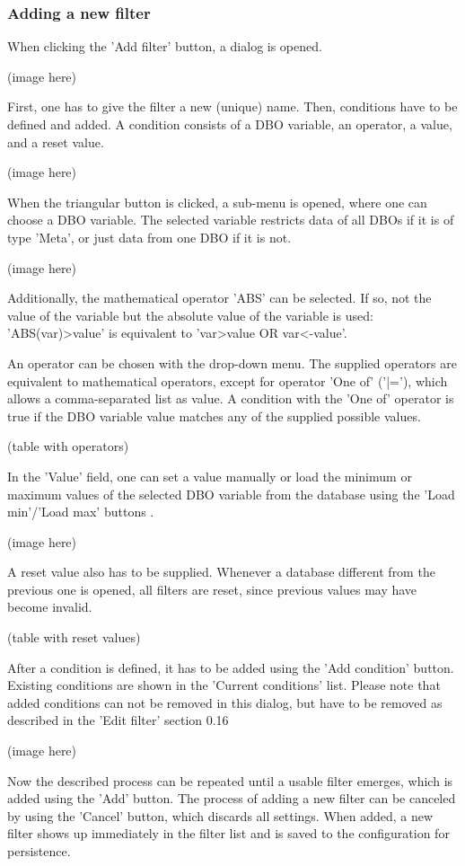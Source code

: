 \documentclass[10pt,letterpaper,extrafontsizes]{memoir}
\begin{document}
\subsubsection{Adding a new filter}
When clicking the 'Add filter' button, a dialog is opened.

(image here)

First, one has to give the filter a new (unique) name. Then, conditions have to be defined and added. A
condition consists of a DBO variable, an operator, a value, and a reset value.

(image here)

When the triangular button is clicked, a sub-menu is opened, where one can choose a DBO variable. The
selected variable restricts data of all DBOs if it is of type 'Meta', or just data from one DBO if it is not.

(image here)

Additionally, the mathematical operator 'ABS' can be selected. If so, not the value of the variable but the
absolute value of the variable is used: 'ABS(var)>value' is equivalent to 'var>value OR var<-value'.

An operator can be chosen with the drop-down menu.  The supplied operators are equivalent to mathematical operators, except for operator 'One of' ('|='), which allows a comma-separated list as value.  A condition with the 'One of' operator is true if the DBO variable value matches any of the supplied possible
values.

(table with operators)

In the 'Value' field, one can set a value manually or load the minimum or maximum values of the selected
DBO variable from the database using the 'Load min'/'Load max' buttons .

(image here)

A reset value also has to be supplied.  Whenever a database different from the previous one is opened,
all filters are reset, since previous values may have become invalid.

(table with reset values)

After a condition is defined, it has to be added using the 'Add condition' button. Existing conditions are
shown in the 'Current conditions' list. Please note that added conditions can not be removed in this dialog,
but have to be removed as described in the 'Edit filter' section 0.16

(image here)

Now the described process can be repeated until a usable filter emerges, which is added using the 'Add'
button. The process of adding a new filter can be canceled by using the 'Cancel' button, which discards all
settings. When added, a new filter shows up immediately in the filter list and is saved to the configuration
for persistence.
\end{document}
